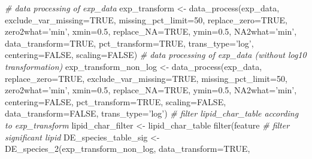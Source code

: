 \documentclass[]{article}
\newcommand{\hlnum}[1]{\textcolor[rgb]{0.816,0.125,0.439}{#1}}%
\newcommand{\hlstr}[1]{\textcolor[rgb]{0.251,0.627,0.251}{#1}}%
\newcommand{\hlcom}[1]{\textcolor[rgb]{0.502,0.502,0.502}{\textit{#1}}}%
\newcommand{\hlopt}[1]{\textcolor[rgb]{0,0,0}{#1}}%
\newcommand{\hlstd}[1]{\textcolor[rgb]{0.251,0.251,0.251}{#1}}%
\newcommand{\hlkwc}[1]{\textcolor[rgb]{0.251,0.251,0.251}{#1}}%
\newcommand{\hlkwd}[1]{\textcolor[rgb]{0.878,0.439,0.125}{#1}}%
\newenvironment{Shaded}{\begin{myshaded}}{\end{myshaded}}
\newcommand{\KeywordTok}[1]{\hlkwd{#1}}
\newcommand{\DataTypeTok}[1]{\hlkwc{#1}}
\newcommand{\DecValTok}[1]{\hlnum{#1}}
\newcommand{\FloatTok}[1]{\hlnum{#1}}
\newcommand{\StringTok}[1]{\hlstr{#1}}
\newcommand{\CommentTok}[1]{\hlcom{#1}}
\newcommand{\OtherTok}[1]{{#1}}
\newcommand{\OperatorTok}[1]{\hlopt{#1}}
\newcommand{\NormalTok}[1]{\hlstd{#1}}
\begin{document}
\begin{Shaded}
\begin{Highlighting}[]
\CommentTok{# data processing of exp_data}
\NormalTok{exp_transform <-}\StringTok{ }\KeywordTok{data_process}\NormalTok{(exp_data, }\DataTypeTok{exclude_var_missing=}\OtherTok{TRUE}\NormalTok{,}
                              \DataTypeTok{missing_pct_limit=}\DecValTok{50}\NormalTok{, }\DataTypeTok{replace_zero=}\OtherTok{TRUE}\NormalTok{,}
                              \DataTypeTok{zero2what=}\StringTok{'min'}\NormalTok{, }\DataTypeTok{xmin=}\FloatTok{0.5}\NormalTok{, }\DataTypeTok{replace_NA=}\OtherTok{TRUE}\NormalTok{,}
                              \DataTypeTok{ymin=}\FloatTok{0.5}\NormalTok{, }\DataTypeTok{NA2what=}\StringTok{'min'}\NormalTok{, }\DataTypeTok{data_transform=}\OtherTok{TRUE}\NormalTok{,}
                              \DataTypeTok{pct_transform=}\OtherTok{TRUE}\NormalTok{, }\DataTypeTok{trans_type=}\StringTok{'log'}\NormalTok{,}
                              \DataTypeTok{centering=}\OtherTok{FALSE}\NormalTok{, }\DataTypeTok{scaling=}\OtherTok{FALSE}\NormalTok{)}
\CommentTok{# data processing of exp_data (without log10 transformation)}
\NormalTok{exp_transform_non_log <-}\StringTok{ }\KeywordTok{data_process}\NormalTok{(exp_data, }\DataTypeTok{replace_zero=}\OtherTok{TRUE}\NormalTok{,}
                                      \DataTypeTok{exclude_var_missing=}\OtherTok{TRUE}\NormalTok{,}
                                      \DataTypeTok{missing_pct_limit=}\DecValTok{50}\NormalTok{,}
                                      \DataTypeTok{zero2what=}\StringTok{'min'}\NormalTok{, }\DataTypeTok{xmin=}\FloatTok{0.5}\NormalTok{,}
                                      \DataTypeTok{replace_NA=}\OtherTok{TRUE}\NormalTok{, }\DataTypeTok{ymin=}\FloatTok{0.5}\NormalTok{,}
                                      \DataTypeTok{NA2what=}\StringTok{'min'}\NormalTok{, }\DataTypeTok{centering=}\OtherTok{FALSE}\NormalTok{,}
                                      \DataTypeTok{pct_transform=}\OtherTok{TRUE}\NormalTok{, }\DataTypeTok{scaling=}\OtherTok{FALSE}\NormalTok{,}
                                      \DataTypeTok{data_transform=}\OtherTok{FALSE}\NormalTok{, }\DataTypeTok{trans_type=}\StringTok{'log'}\NormalTok{)}
\CommentTok{# filter lipid_char_table according to exp_transform}
\NormalTok{lipid_char_filter <-}\StringTok{ }\NormalTok{lipid_char_table }\OperatorTok{%
\StringTok{  }\KeywordTok{filter}\NormalTok{(feature }\OperatorTok{%
\CommentTok{# filter significant lipid}
\NormalTok{DE_species_table_sig <-}\StringTok{ }\KeywordTok{DE_species_2}\NormalTok{(exp_transform_non_log,}
                                     \DataTypeTok{data_transform=}\OtherTok{TRUE}\NormalTok{,}
}}
\end{Highlighting}
\end{Shaded}
\end{document}
